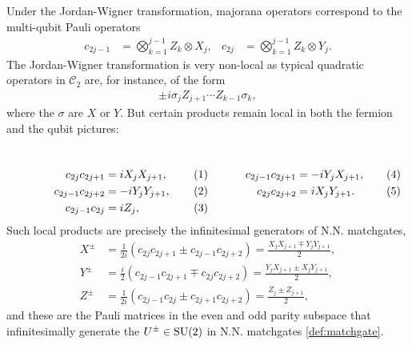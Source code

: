 Under the Jordan-Wigner transformation, majorana operators correspond to the multi-qubit Pauli operators
\begin{align}
c_{2j-1} &= \bigotimes_{k=1}^{j-1} Z_k \otimes X_j, &
c_{2j} &= \bigotimes_{k=1}^{j-1} Z_k \otimes Y_j.
\end{align}
The Jordan-Wigner transformation is very non-local as typical quadratic operators in $\mathcal{C}_2$ are, for instance, of the form
\begin{align}
	\pm i\sigma_j Z_{j+1} \cdots Z_{k-1}\sigma_k,
\end{align}
where the $\sigma$ are $X$ or $Y$.
But certain products remain local in both the fermion and the qubit pictures:
\begin{equation*}
\noindent\begin{minipage}[t]{.5\textwidth}
\begin{align}
c_{2j} c_{2j+1} &= iX_j X_{j+1}, \\
c_{2j-1} c_{2j+2} &= -iY_j Y_{j+1}, \\
c_{2j-1} c_{2j} &= iZ_j,
\end{align}
\end{minipage}
\begin{minipage}[t]{.5\textwidth}
\begin{align}
c_{2j-1} c_{2j+1} &= -i Y_j X_{j+1}, \\
c_{2j} c_{2j+2} &= iX_j Y_{j+1}.
\end{align}
\end{minipage} \nonumber
\end{equation*}
Such local products are precisely the infinitesimal generators of N.N. matchgates,
\begin{align}
	X^{\pm} &= \frac{1}{2i} (c_{2j} c_{2j+1} \pm c_{2j-1} c_{2j+2}) = \frac{X_j X_{j+1} \mp Y_j Y_{j+1}}{2}, \\
    Y^{\pm} &= \frac{i}{2} (c_{2j-1} c_{2j+1} \mp c_{2j} c_{2j+2}) = \frac{Y_j X_{j+1} \pm X_j Y_{j+1}}{2}, \\
    Z^{\pm} &= \frac{1}{2i} (c_{2j-1} c_{2j} \pm c_{2j+1} c_{2j+2}) = \frac{Z_j \pm Z_{j+1}}{2},
\end{align}
and these are the Pauli matrices in the even and odd parity subspace that infinitesimally generate the $U^{\pm} \in \text{SU}(2)$ in N.N. matchgates \eqref{def:matchgate}.

